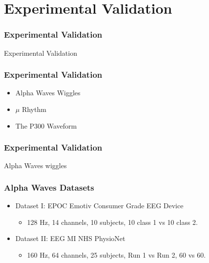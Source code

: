 \documentclass[aspectratio=169]{beamer}
\newcommand\Fontre{\fontsize{16}{16.2}\selectfont}
\begin{document}
\section{Experimental Validation}
\begin{frame}
\frametitle{Experimental Validation}
\begin{center}
\LARGE Experimental Validation
\end{center}
\end{frame}

\begin{frame}
\frametitle{Experimental Validation}
\begin{center}
\begin{itemize}
 \item<1-> \Fontre Alpha Waves Wiggles
 \item<2-> \Fontre $\mu$ Rhythm
 \item<3-> \Fontre The P300 Waveform
\end{itemize}
\end{center}
\end{frame}     

\begin{frame}
\frametitle{Experimental Validation}
\begin{center}
\LARGE Alpha Waves wiggles
\end{center}
\end{frame}

\begin{frame}
\frametitle{Alpha Waves Datasets}
\begin{center}
\begin{itemize}
\item \Fontre Dataset I: EPOC Emotiv Consumer Grade EEG Device 
\begin{itemize}
\item 128 Hz, 14 channels, 10 subjects, 10 class 1 vs 10 class 2.
\end{itemize}
\item \Fontre Dataset II: EEG MI NHS PhysioNet
\begin{itemize}
\item 160 Hz, 64 channels, 25 subjects, Run 1 vs Run 2, 60 vs 60.
\end{itemize}
\end{itemize}
\end{center}
\end{frame}
\end{document}
